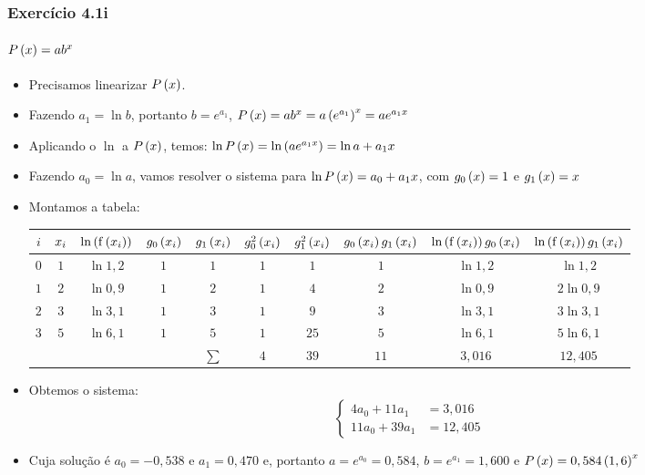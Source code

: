 \begin{frame}
\frametitle{Exercício 4.1i}
\framesubtitle{$P\left(x\right) = a b^x$}
\scriptsize
\begin{itemize}[<+->]
  \item Precisamos linearizar $P \left(x \right)$.
  \item Fazendo $a_1 = \ln b$, portanto $b = e^{a_1}$, $P\left(x \right) = ab^x = a \left(e^{a_1}\right)^x = a e^{a_1x}$
  \item Aplicando o $\ln$ a $P \left(x \right)$, temos: $\operatorname{\mathrm{ln}} P\left(x\right) = \operatorname{\mathrm{ln}} \left(a e^{a_1x}\right) = \operatorname{\mathrm{ln}} a + a_1x$
  \item Fazendo $a_0 = \ln a$, vamos resolver o sistema para $\operatorname{\mathrm{ln}} P \left(x\right) = a_0 + a_1 x$, com $g_0\left(x\right) = 1$ e $g_1 \left(x\right) = x$
  \item Montamos a tabela:
\begin{tabular}{c|c|c|c|c|c|c|c|c|c}
$i$ & 
  $x_i$ & 
  $\operatorname{\mathrm{ln}} \left( \mathrm{f} \left(x_i\right) \right)$ &
  $g_0 \left(x_i\right)$ &
  $g_1 \left(x_i\right)$ &
  $g_0^2 \left(x_i\right)$ &
  $g_1^2 \left(x_i\right)$ &
  $g_0 \left(x_i\right) g_1 \left(x_i\right)$ &
  $\operatorname{\mathrm{ln}} \left(\mathrm{f} \left(x_i\right) \right) g_0 \left(x_i\right)$ &
  $\operatorname{\mathrm{ln}} \left(\mathrm{f} \left(x_i\right) \right) g_1 \left(x_i\right)$\\
\hline
$0$ & $1$ & $\ln 1,2$ & $1$ & $1$ & $1$ & $1$  & $1$ & $\ln 1,2$ & $\ln 1,2$\\
$1$ & $2$ & $\ln 0,9$ & $1$ & $2$ & $1$ & $4$  & $2$ & $\ln 0,9$ & $2 \ln 0,9$\\
$2$ & $3$ & $\ln 3,1$ & $1$ & $3$ & $1$ & $9$  & $3$ & $\ln 3,1$ & $3 \ln 3,1$\\
$3$ & $5$ & $\ln 6,1$ & $1$ & $5$ & $1$ & $25$ & $5$ & $\ln 6,1$ & $5 \ln 6,1$\\
\hline
& & & & $\sum$ & $4$ & $39$ & $11$ & $3,016$ & $12,405$  
\end{tabular}
  \item Obtemos o sistema:
\[
\begin{cases}
4 a_0 + 11 a_1 &= 3,016\\
%
11 a_0 + 39 a_1 &= 12,405
\end{cases}
\]
  \item Cuja solução é $a_0 = -0,538$ e $a_1 = 0,470$ e, portanto $a = e^{a_0} = 0,584$, $b = e^{a_1} = 1,600$ e $P\left(x\right) = 0,584 \left(1,6\right)^x$
\end{itemize}

\end{frame}